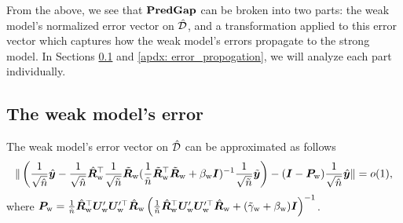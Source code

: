 From the above, we see that $\textbf{PredGap}{}$ can be broken into two parts: the weak model's normalized error vector on $\hat{{\mathcal{D}}}$, and a transformation applied to this error vector which captures how the weak model's errors propagate to the strong model. In Sections \ref{apdx: weak_error} and \ref{apdx: error_propogation}, we will analyze each part individually.

\subsection{The weak model's error}\label{apdx: weak_error}


\begin{lemma}\label{lemma: weak_error}
The weak model's error vector on $\hat{{\mathcal{D}}}$ can be approximated as follows
\begin{align}
\nonumber
\|\left(\frac{1}{\sqrt{\hat{n}}}\hat{{\bm{y}}}-   \frac{1}{\sqrt{\hat{n}}} \hat{{\bm{R}}}_{\text{w}}^\top  \frac{1}{\sqrt{\tilde{n}}}\tilde{{\bm{R}}}_{\text{w}} (\frac{1}{\tilde{n}}\tilde{{\bm{R}}}_{\text{w}}^\top \tilde{{\bm{R}}}_{\text{w}} + \beta_{\text{w}}{\bm{I}} )^{-1}\frac{1}{\sqrt{\tilde{n}}}\tilde{{\bm{y}}}\right) - ({\bm{I}} -{\bm{P}}_{\text{w}} )\frac{1}{\sqrt{\hat{n}}}\hat{{\bm{y}}} \|= o(1),
\end{align}
where ${\bm{P}}_{\text{w}} = \frac{1}{\hat{n}} \hat{{\bm{R}}}_{\text{w}}^\top {\bm{U}}_{\text{w}}' {\bm{U}}_{\text{w}}'^\top \hat{{\bm{R}}}_{\text{w}}\left(\frac{1}{\tilde{n}}  \hat{{\bm{R}}}_{\text{w}}^\top {\bm{U}}_{\text{w}}'{\bm{U}}_{\text{w}}'^\top\hat{{\bm{R}}}_{\text{w}}+(\tilde{\gamma}_{\text{w}}+ \beta_{\text{w}}){\bm{I}} \right)^{-1} $.
\end{lemma}
